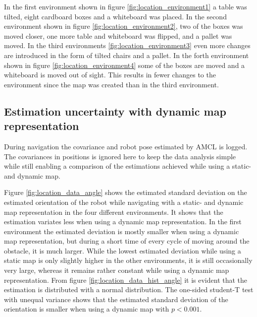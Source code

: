 In the first environment shown in figure \ref{fig:location_environment1} a table was tilted, eight cardboard boxes and a whiteboard was placed. 
In the second environment shown in figure \ref{fig:location_environment2}, two of the boxes was moved closer, one more table and whiteboard was flipped, and a pallet was moved. 
In the third environments \ref{fig:location_environment3} even more changes are introduced in the form of tilted chairs and a pallet. 
In the forth environment shown in figure \ref{fig:location_environment4} some of the boxes are moved and a whiteboard is moved out of sight. 
This results in fewer changes to the environment since the map was created than in the third environment.

\subsection{Estimation uncertainty with dynamic map representation}
During navigation the covariance and robot pose estimated by AMCL is logged. 
The covariances in positions is ignored here to keep the data analysis simple while still enabling a comparison of the estimations achieved while using a static- and dynamic map.

Figure \ref{fig:location_data_angle} shows the estimated standard deviation on the estimated orientation of the robot while navigating with a static- and dynamic map representation in the four different environments.
It shows that the estimation variates less when using a dynamic map representation.
In the first environment the estimated deviation is mostly smaller when using a dynamic map representation, but during a short time of every cycle of moving around the obstacle, it is much larger. 
While the lowest estimated deviation while using a static map is only slightly higher in the other environments, it is still occasionally very large, whereas it remains rather constant while using a dynamic map representation. 
From figure \ref{fig:location_data_hist_angle} it is evident that the estimation is distributed with a normal distribution.
The one-sided student-T test with unequal variance shows that the estimated standard deviation of the orientation is smaller when using a dynamic map with $p < 0.001$.

